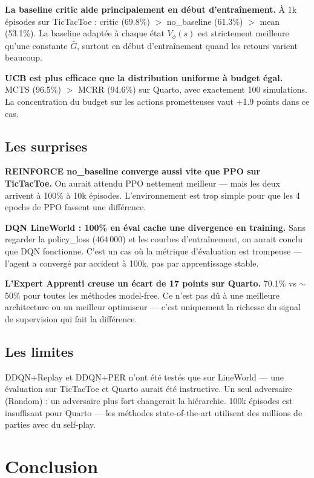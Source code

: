 \documentclass[12pt,a4paper]{article}
\begin{document}
\textbf{La baseline critic aide principalement en début d'entraînement.} À 1k épisodes sur TicTacToe : critic (69.8\%) $>$ no\_baseline (61.3\%) $>$ mean (53.1\%). La baseline adaptée à chaque état $V_\phi(s)$ est strictement meilleure qu'une constante $\bar{G}$, surtout en début d'entraînement quand les retours varient beaucoup.

\textbf{UCB est plus efficace que la distribution uniforme à budget égal.} MCTS (96.5\%) $>$ MCRR (94.6\%) sur Quarto, avec exactement 100 simulations. La concentration du budget sur les actions prometteuses vaut +1.9 points dans ce cas.

\subsection{Les surprises}

\textbf{REINFORCE no\_baseline converge aussi vite que PPO sur TicTacToe.} On aurait attendu PPO nettement meilleur — mais les deux arrivent à 100\% à 10k épisodes. L'environnement est trop simple pour que les 4 epochs de PPO fassent une différence.

\textbf{DQN LineWorld : 100\% en éval cache une divergence en training.} Sans regarder la policy\_loss (464\,000) et les courbes d'entraînement, on aurait conclu que DQN fonctionne. C'est un cas où la métrique d'évaluation est trompeuse — l'agent a convergé par accident à 100k, pas par apprentissage stable.

\textbf{L'Expert Apprenti creuse un écart de 17 points sur Quarto.} 70.1\% vs $\sim$50\% pour toutes les méthodes model-free. Ce n'est pas dû à une meilleure architecture ou un meilleur optimiseur — c'est uniquement la richesse du signal de supervision qui fait la différence.

\subsection{Les limites}

DDQN+Replay et DDQN+PER n'ont été testés que sur LineWorld — une évaluation sur TicTacToe et Quarto aurait été instructive. Un seul adversaire (Random) : un adversaire plus fort changerait la hiérarchie. 100k épisodes est insuffisant pour Quarto — les méthodes state-of-the-art utilisent des millions de parties avec du self-play.

\section{Conclusion}
\end{document}
